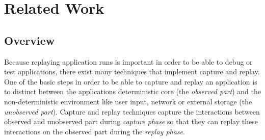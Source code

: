 \chapter{Related Work}
\section{Overview}
Because replaying application runs is important in order to be able to debug or test applications, there exist many techniques that implement capture and replay. One of the basic steps in order to be able to capture and replay an application is to distinct between the applications deterministic core (the \emph{observed part}) and the non-deterministic environment like user input, network or external storage (the \emph{unobserved part}). Capture and replay techniques capture the interactions between observed and unobserved part during \emph{capture phase} so that they can replay these interactions on the observed part during the \emph{replay phase}.

% 

% 

